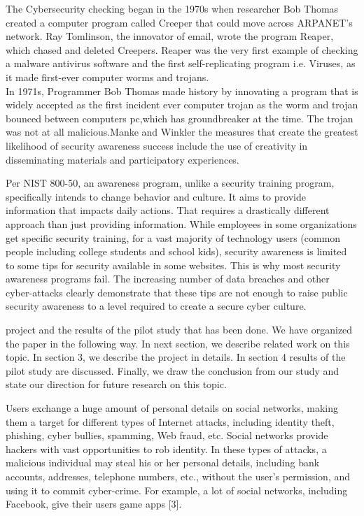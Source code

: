 \hspace*{0.3in}The Cybersecurity checking began in the 1970s when researcher Bob Thomas created a computer program called Creeper that could move across ARPANET's network. Ray Tomlinson, the innovator of email, wrote the program Reaper, which chased and deleted Creepers. Reaper was the very first example of checking a malware antivirus software and the first self-replicating program i.e. Viruses, as it made first-ever computer worms and trojans.
\\

\hspace*{0.3in} In 1971s, Programmer Bob Thomas made history by innovating a program that is widely accepted as the first incident ever computer trojan as the worm and trojan bounced between computers pc,which has groundbreaker at the time. The trojan was not at all malicious.Manke and Winkler the measures that create the greatest likelihood of security awareness success include the use of creativity in disseminating materials and participatory experiences.

Per NIST 800-50, an awareness program, unlike a security training program, specifically intends to change behavior and culture. It aims to provide information that impacts daily actions. That requires a drastically different approach than just providing information. While employees in some organizations get specific security training, for a vast majority of technology users (common people including college students and school kids), security awareness is limited to some tips for security available in some websites. This is why most security awareness programs fail. The increasing number of data breaches and other cyber-attacks clearly demonstrate that these tips are not enough to raise public security awareness to a level required to create a secure cyber culture.

project and the results of the pilot study that has been done. We have organized the paper in the following way. In next section, we describe related work on this topic. In section 3, we describe the project in details. In section 4 results of the pilot study are discussed. Finally, we draw the conclusion from our study and state our direction for future research on this topic.

    Users exchange a huge amount of personal details on
social networks, making them a target for different types of
Internet attacks, including identity theft, phishing, cyber
bullies, spamming, Web fraud, etc. Social networks provide
hackers with vast opportunities to rob identity. In these types
of attacks, a malicious individual may steal his or her personal
details, including bank accounts, addresses, telephone
numbers, etc., without the user's permission, and using it to
commit cyber-crime. For example, a lot of social networks,
including Facebook, give their users game apps [3]. 

